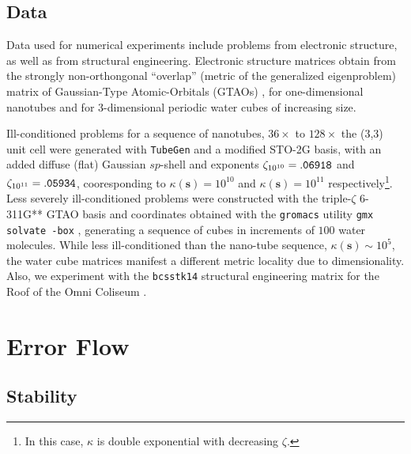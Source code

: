 \documentclass[letterpaper,twocolumn,amsmath,amsfont,amssymb,english,aps,jcp,preprintnumbers,groupaddress,nofootinbib,tightenlines,floatfix]{revtex4}
\newcommand{\mat}[1]{\boldsymbol{#1}}
\theoremstyle{plain}
\theoremstyle{remark}
\theoremstyle{plain}
\begin{document}
\subsection{Data} \label{data}

Data used for numerical experiments include problems from electronic structure, as well as from structural engineering. 
Electronic structure matrices obtain from the strongly non-orthongonal ``overlap'' (metric of the generalized eigenproblem) 
matrix of Gaussian-Type Atomic-Orbitals (GTAOs) \cite{}, for one-dimensional nanotubes and for 3-dimensional periodic water
cubes of increasing size. 
 
Ill-conditioned problems for a sequence of nanotubes, $36 \times$ to $128 \times$ the (3,3) unit cell 
were generated with {\tt TubeGen} \cite{tubegen} and a modified STO-2G \cite{Schuchardt2007} basis,
with an added diffuse (flat) Gaussian $sp$-shell and exponents $\zeta_{10^{10}}={\tt .06918}$ and $\zeta_{10^{11}}={\tt .05934}$, 
cooresponding to $\kappa(\mat{s})=10^{10}$ and $\kappa(\mat{s})=10^{11}$ 
respectively\footnote{In this case, $\kappa$ is double exponential with decreasing $\zeta$.}.  Less severely ill-conditioned
problems were constructed with the triple-$\zeta$ 6-311G** GTAO basis \cite{Schuchardt2007} and coordinates obtained with the 
{\tt gromacs} utility {\tt gmx solvate -box} \cite{gmx30}, generating a sequence of cubes in increments of $100$ water molecules.  
While less ill-conditioned than the nano-tube sequence, 
$\kappa(\mat{s})\sim 10^5$, the water cube matrices manifest a different metric locality due to dimensionality.   
Also, we experiment with the {\tt bcsstk14} structural engineering matrix for the Roof of the Omni Coliseum \cite{BCSSTK14}.

\section{Error Flow}%

\subsection{Stability}\label{stability}

\end{document}
